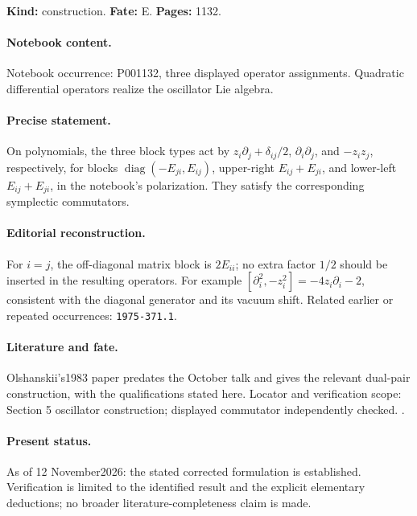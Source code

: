 \label{item:1983-607.6}

\noindent\textbf{Kind:} construction. \textbf{Fate:} E. \textbf{Pages:} 1132.\par

\paragraph{Notebook content.} Notebook occurrence: P001132, three displayed operator assignments. Quadratic differential operators realize the oscillator Lie algebra.

\paragraph{Precise statement.} On polynomials, the three block types act by \(z_i\partial_j+\delta_{ij}/2\), \(\partial_i\partial_j\), and \(-z_iz_j\), respectively, for blocks \(\operatorname{diag}(-E_{ji},E_{ij})\), upper-right \(E_{ij}+E_{ji}\), and lower-left \(E_{ij}+E_{ji}\), in the notebook's polarization. They satisfy the corresponding symplectic commutators.

\paragraph{Editorial reconstruction.} For \(i=j\), the off-diagonal matrix block is \(2E_{ii}\); no extra factor \(1/2\) should be inserted in the resulting operators. For example \([\partial_i^2,-z_i^2]=-4z_i\partial_i-2\), consistent with the diagonal generator and its vacuum shift. Related earlier or repeated occurrences: \texttt{1975-371.1}.

\paragraph{Literature and fate.} Olshanskii's1983 paper predates the October talk and gives the relevant dual-pair construction, with the qualifications stated here. Locator and verification scope: Section 5 oscillator construction; displayed commutator independently checked. \cite{olshanskii1983pairs}.

\paragraph{Present status.} As of 12 November2026: the stated corrected formulation is established. Verification is limited to the identified result and the explicit elementary deductions; no broader literature-completeness claim is made.

